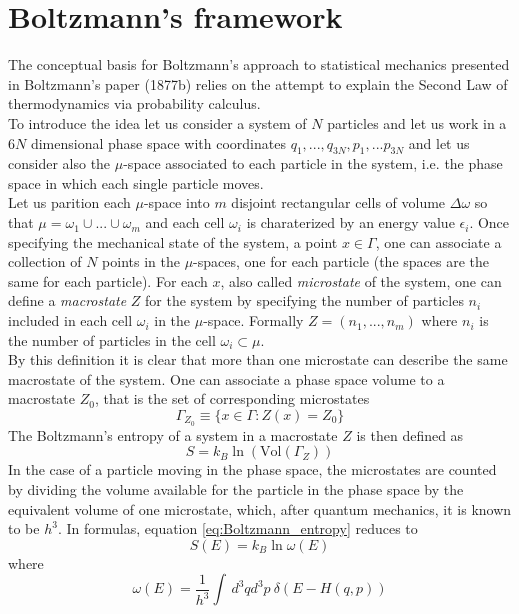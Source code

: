 \section{Boltzmann's framework}
The conceptual basis for Boltzmann's approach to statistical mechanics presented in Boltzmann's paper (1877b) relies on the attempt to explain the Second Law of thermodynamics via probability calculus. \\
To introduce the idea let us consider a system of $N$ particles and let us work in a $6N$ dimensional phase space with coordinates $q_1,...,q_{3N}, p_1, ... p_{3N}$ and let us consider also the $\mu$-space associated to each particle in the system, i.e. the phase space in which each single particle moves. \\
Let us parition each $\mu$-space into $m$ disjoint rectangular cells of volume $\Delta\omega$ so that $\mu = \omega_1 \cup ... \cup \omega_m$ and each cell $\omega_i$ is charaterized by an energy value $\epsilon_i$. Once specifying the mechanical state of the system, a point $x \in \Gamma$, one can 
associate a collection of $N$ points in the $\mu$-spaces, one for each particle (the spaces are the same for each particle). For each $x$, also called \emph{microstate} of the system, one can define a \emph{macrostate} $Z$ for the system by specifying the number of particles $n_i$ included in each cell $\omega_i$ in the $\mu$-space. 
Formally $Z = (n_1, ... , n_m)$ where $n_i$ is the number of particles in the cell $\omega_i \subset \mu$. \\
By this definition it is clear that more than one microstate can describe the same macrostate of the system. One can associate a phase space volume to a macrostate $Z_0$, that is the set of corresponding microstates
\begin{equation*}
    \Gamma_{Z_0} \equiv \{x \in \Gamma : Z(x) = Z_0\}
\end{equation*}
The Boltzmann's entropy of a system in a macrostate $Z$ is then defined as
\begin{equation}
    S = k_B \ln\left( \text{Vol}(\Gamma_Z)\right)
    \label{eq:Boltzmann_entropy}
\end{equation}
In the case of a particle moving in the phase space, the microstates are counted by dividing the volume available for the particle in the phase space by the equivalent volume of one microstate, which, after quantum mechanics, it is known to be $h^3$.
In formulas, equation \ref{eq:Boltzmann_entropy} reduces to
\begin{equation*}
    S(E) = k_B \ln \omega(E)
\end{equation*}
where
\begin{equation*}
    \omega(E) = \frac{1}{h^3} \int \, d^3qd^3p \ \delta(E - H(q, p))
\end{equation*}
